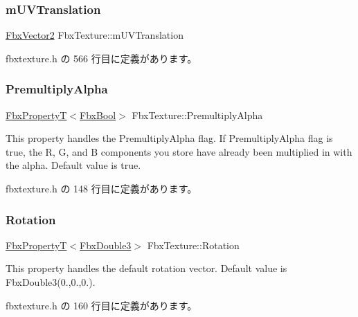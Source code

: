\subsubsection{\texorpdfstring{m\+U\+V\+Translation}{mUVTranslation}}
{\footnotesize\ttfamily \hyperlink{class_fbx_vector2}{Fbx\+Vector2} Fbx\+Texture\+::m\+U\+V\+Translation\hspace{0.3cm}{\ttfamily [protected]}}



 fbxtexture.\+h の 566 行目に定義があります。

\mbox{\label{class_fbx_texture_a1acbc324c1df7d407aaccf0b3f151d29}} 
\subsubsection{\texorpdfstring{Premultiply\+Alpha}{PremultiplyAlpha}}
{\footnotesize\ttfamily \hyperlink{class_fbx_property_t}{Fbx\+PropertyT}$<$\hyperlink{fbxtypes_8h_a92e0562b2fe33e76a242f498b362262e}{Fbx\+Bool}$>$ Fbx\+Texture\+::\+Premultiply\+Alpha}

This property handles the Premultiply\+Alpha flag. If Premultiply\+Alpha flag is true, the R, G, and B components you store have already been multiplied in with the alpha. Default value is true. 

 fbxtexture.\+h の 148 行目に定義があります。

\mbox{\label{class_fbx_texture_a299b7759e086a905185a2dabe8a5b510}} 
\subsubsection{\texorpdfstring{Rotation}{Rotation}}
{\footnotesize\ttfamily \hyperlink{class_fbx_property_t}{Fbx\+PropertyT}$<$\hyperlink{fbxtypes_8h_ae0a96f14cde566774c7553aa7523b7a7}{Fbx\+Double3}$>$ Fbx\+Texture\+::\+Rotation}

This property handles the default rotation vector. Default value is Fbx\+Double3(0.,0.,0.). 

 fbxtexture.\+h の 160 行目に定義があります。

\mbox{\label{class_fbx_texture_ae3f8835e136b889fbcd6b388c452310e}} 
